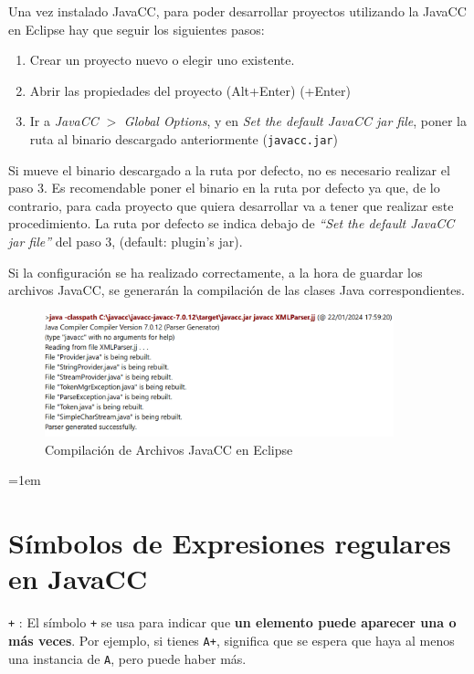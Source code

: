 Una vez instalado JavaCC, para poder desarrollar proyectos utilizando la JavaCC en Eclipse hay que seguir los siguientes pasos:
\begin{enumerate}
    \item Crear un proyecto nuevo o elegir uno existente.
    \item Abrir las propiedades del proyecto (Alt+Enter) (\cmdkey+Enter)
    \item  Ir a \textit{JavaCC} $>$ \textit{Global Options}, y en \textit{Set the default JavaCC jar file}, poner la ruta al binario descargado anteriormente (\lstinline|javacc.jar|)
\end{enumerate}

Si mueve el binario descargado a la ruta por defecto, no es necesario realizar el paso 3. Es recomendable poner el binario en la ruta por defecto ya que, de lo contrario, para cada proyecto que quiera desarrollar va a tener que realizar este procedimiento. La ruta por defecto se indica debajo de \textit{“Set the default JavaCC jar file”} del paso 3, (default: plugin’s jar).

Si la configuración se ha realizado correctamente, a la hora de guardar los archivos JavaCC, se generarán la compilación de las clases Java correspondientes.

\begin{figure}[H]
\centering
\includegraphics[width=0.9\textwidth]{imagenes/javacccompilation.png}
\caption{\label{fig:javacccompilation}Compilación de Archivos JavaCC en Eclipse}
\end{figure}
\emergencystretch=1em
\section{Símbolos de Expresiones regulares en JavaCC}
\label{sec:simbolosdeexpresionesregulares}
\lstinline[basicstyle=\large\ttfamily]|+| : El símbolo \lstinline[basicstyle=\large\ttfamily]|+| se usa para indicar que \textbf{un elemento puede aparecer una o más veces}. Por ejemplo, si tienes \lstinline[basicstyle=\large\ttfamily]|A+|, significa que se espera que haya al menos una instancia de \lstinline[basicstyle=\large\ttfamily]|A|, pero puede haber más.


